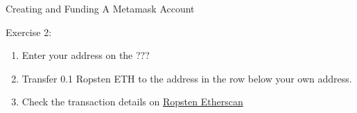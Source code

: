 \documentclass[handout]{beamer}
\begin{document}
\begin{frame}{Creating and Funding A Metamask Account}

	\begin{exercise}{Exercise 2:}
		\begin{enumerate}
			\item Enter your address on the \link ???
			\item Transfer 0.1 Ropsten ETH to the address in the row below your own address.
			\item Check the transaction details on \link \href{https://ropsten.etherscan.io/}{Ropsten Etherscan}
		\end{enumerate}
	\end{exercise}	
\end{frame}
\end{document}
